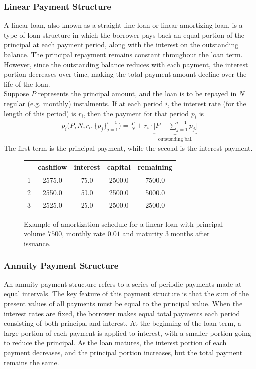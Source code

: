 \documentclass[11pt]{article}
\begin{document}
	


\subsubsection{Linear Payment Structure}

A linear loan, also known as a straight-line loan or linear amortizing loan, is a type of loan structure in which the borrower pays back an equal portion of the principal at each payment period, along with the interest on the outstanding balance. The principal repayment remains constant throughout the loan term. However, since the outstanding balance reduces with each payment, the interest portion decreases over time, making the total payment amount decline over the life of the loan.\\

Suppose $P$ represents the principal amount, and the loan is to be repayed in $N$ regular (e.g. monthly) instalments. If at each period $i$, the interest rate (for the length of this period) is $r_i$, then the payment for that period $p_i$ is 
\begin{align}
	p_i\big(P,N,r_i,\{p_j\}_{j=1}^{i-1}\big)= \frac{P}{N}+r_i\cdot\underbrace{\bigg[P-\sum_{j=1}^{i-1}p_j\bigg]}_{\text{outstanding bal.}}
	\label{linear}
\end{align}
The first term is the principal payment, while the second is the interest payment.
\begin{figure}[ht!]
	\centering
	\begin{tabular}{|c|c|c|c|c|}
		\hline
		& cashflow & interest & capital & remaining\\
		\hline
		1 & 2575.0 & 75.0 & 2500.0 & 7500.0\\
		\hline
		2 & 2550.0 & 50.0 & 2500.0 & 5000.0\\
		\hline
		3 & 2525.0 & 25.0 & 2500.0 & 2500.0\\
		\hline
	\end{tabular}
	\caption{Example of amortization schedule for a linear loan with principal volume $7500$, monthly rate $0.01$ and maturity 3 months after issuance.}
\end{figure}



\subsubsection{Annuity Payment Structure}

An annuity payment structure refers to a series of periodic payments made at equal intervals. The key feature of this payment structure is that the sum of the present values of all payments must be equal to the principal value. When the interest rates are fixed, the borrower makes equal total payments each period consisting of both principal and interest. At the beginning of the loan term, a large portion of each payment is applied to interest, with a smaller portion going to reduce the principal. As the loan matures, the interest portion of each payment decreases, and the principal portion increases, but the total payment remains the same.\\
\end{document}
